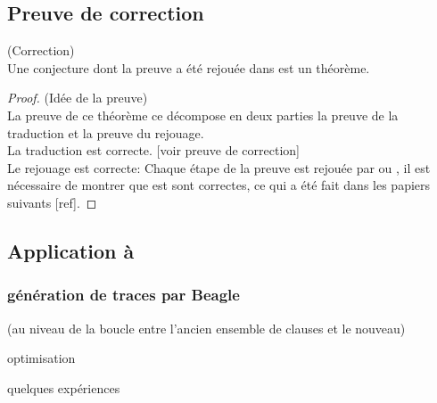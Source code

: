 \subsection{Preuve de correction}
\begin{thm}(Correction)
\\Une conjecture dont la preuve a été rejouée dans \holfour est un théorème.
\end{thm}

\begin{proof}(Idée de la preuve)
\\La preuve de ce théorème ce décompose en deux parties la preuve de la traduction et la preuve du rejouage.
\\La traduction est correcte. [voir preuve de correction]
\\Le rejouage est correcte: Chaque étape de la preuve est rejouée par \metistac ou \coopertac, il est nécessaire de montrer que \metistac est \coopertac sont correctes, ce qui a été fait dans les papiers suivants [ref].
\end{proof}



\subsection{Application à \beagle}

\subsubsection{génération de traces par Beagle}


 (au niveau de la boucle entre
  l'ancien ensemble de clauses et le nouveau)

 optimisation

quelques expériences


